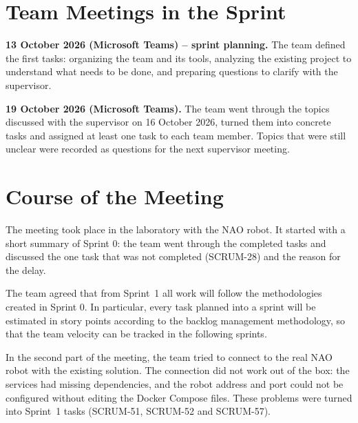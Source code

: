 \documentclass[12pt,a4paper]{article}
\newcommand{\sprintname}{Sprint 0}
\begin{document}

\section{Team Meetings in the Sprint}

\textbf{13 October 2026 (Microsoft Teams) -- sprint planning.}
The team defined the first tasks: organizing the team and its tools,
analyzing the existing project to understand what needs to be done,
and preparing questions to clarify with the supervisor.

\textbf{19 October 2026 (Microsoft Teams).}
The team went through the topics discussed with the supervisor on
16 October 2026, turned them into concrete tasks and assigned at least one
task to each team member. Topics that were still unclear were recorded as
questions for the next supervisor meeting.



\section{Course of the Meeting}

The meeting took place in the laboratory with the NAO robot. It started
with a short summary of \sprintname{}: the team went through the completed
tasks and discussed the one task that was not completed (SCRUM-28) and the
reason for the delay.

The team agreed that from Sprint~1 all work will follow the methodologies
created in \sprintname{}. In particular, every task planned into a sprint
will be estimated in story points according to the backlog management
methodology, so that the team velocity can be tracked in the following
sprints.

In the second part of the meeting, the team tried to connect to the real
NAO robot with the existing solution. The connection did not work out of
the box: the services had missing dependencies, and the robot address and
port could not be configured without editing the Docker Compose files.
These problems were turned into Sprint~1 tasks (SCRUM-51, SCRUM-52 and
SCRUM-57).

\end{document}
